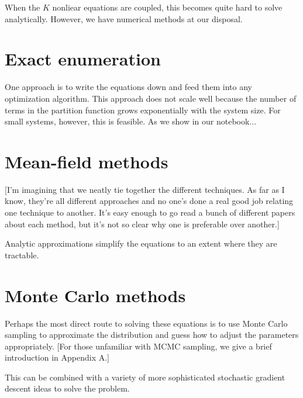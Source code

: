 \documentclass[aps,prl,twocolumn]{revtex4-1}
\begin{document}
When the $K$ nonliear equations are coupled, this becomes quite hard to solve analytically. However, we have numerical methods at our disposal.

\section{Exact enumeration}
One approach is to write the equations down and feed them into any optimization algorithm. This approach does not scale well because the number of terms in the partition function grows exponentially with the system size. For small systems, however, this is feasible. As we show in our notebook...

\section{Mean-field methods}
[I'm imagining that we neatly tie together the different techniques. As far as I know, they're all different approaches and no one's done a real good job relating one technique to another. It's easy enough to go read a bunch of different papers about each method, but it's not so clear why one is preferable over another.]

Analytic approximations simplify the equations to an extent where they are tractable.

\section{Monte Carlo methods}
Perhaps the most direct route to solving these equations is to use Monte Carlo sampling to approximate the distribution and guess how to adjust the parameters appropriately. [For those unfamiliar with MCMC sampling, we give a brief introduction in Appendix A.]

This can be combined with a variety of more sophisticated stochastic gradient descent ideas to solve the problem.
\end{document}

